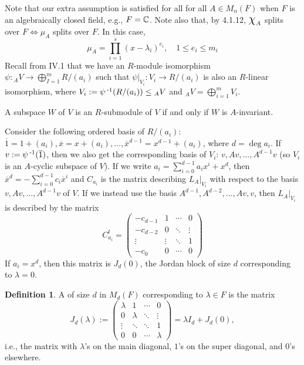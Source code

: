 \documentclass[11pt]{book}
\theoremstyle{definition}   \newtheorem{defn}[counter]{Definition} %
\newcommand{\ov}{\overline}   \newcommand{\wt}{\widetilde}
\newcommand{\mymatrix}[2]{\left( \begin{array}{#1} #2 \end{array} \right)}
\newcommand{\Chi}{\mbox{\Large $\chi$}}
\DeclareMathOperator{\ra}{\rightarrow}   \DeclareMathOperator{\Poly}{\mathbf{P}}   \DeclareMathOperator{\spn}{\textnormal{span}}   \DeclareMathOperator{\aut}{\textnormal{Aut}}
\newcommand{\vs}{\vspace{8pt}}   \newcommand{\hs}{\hspace{8pt}}
\numberwithin{counter}{chapter}
\begin{document}
Note that our extra assumption is satisfied for all for all $A \in M_n(F)$ when $F$ is an algebraically closed field, e.g., $F = \operatorname{\mathbb{C}}$. Note also that, by 4.1.12, $\Chi_A$ splits over $F \iff \mu_A$ splits over $F$. In this case,
	\[\mu_A = \prod_{i=1}^s (x-\lambda_i)^{e_i}, \quad 1 \leq e_i \leq m_i \]
Recall from IV.1 that we have an $R$-module isomorphism $\psi : {_AV} \ra \bigoplus_{I=1}^m R/(a_i)$ such that $\psi|_{V_i} : V_i \ra R/(a_i)$ is also an $R$-linear isomorphism, where $V_i := \psi\operatorname{^{-1}}(R/(a_i)) \leq {_AV}$ and ${_AV} = \bigoplus_{i=1}^m V_i$. 

\vs

\begin{remark*}
A subspace $W$ of $V$ is an $R$-submodule of $V$ if and only if $W$ is $A$-invariant. 
\end{remark*}

\vs

Consider the following ordered basis of $R/(a_i)$: $\ov{1} = 1 + (a_i), \ov{x} = x + (a_i),\dots, \ov{x}^{d-1} = x^{d-1} + (a_i)$, where $d = \deg a_i$. If $v := \psi\inv(\ov{1})$, then we also get the corresponding basis of $V_i$: $v, Av, \dots, A^{d-1}v$ (so $V_i$ is an $A$-cyclic subspace of $V$). If we write $a_i = \sum_{i=0}^{d-1} a_i x^i + x^d$, then $\ov{x}^d = -\sum_{i=0}^{d-1} c_i \ov{x}^i$ and $C_{a_i}$ is the matrix describing $L_A|_{V_i}$ with respect to the basis $v,Av,\dots,A^{d-1}v$ of $V$. If we instead use the basis $A^{d-1},A^{d-2},\dots,Av,v$, then $L_A|_{V_i}$ is described by the matrix
	\[C_{a_i}^t = \mymatrix{cccc}{-c_{d-1} & 1 & \cdots & 0 \\ -c_{d-2} & 0 & \ddots & \vdots \\ \vdots & \vdots & \ddots & 1 \\ -c_0 & 0 & \cdots & 0} \]
If $a_i = x^d$, then this matrix is $J_d(0)$, the Jordan block of size $d$ corresponding to $\lambda = 0$. 

\vs

\begin{defn}
A  of size $d$ in $M_d(F)$ corresponding to $\lambda \in F$ is the matrix
	\[J_d(\lambda) := \mymatrix{cccc}{\lambda & 1 & \cdots & 0 \\ 0 & \lambda & \ddots & \vdots \\ \vdots & \ddots & \ddots & 1 \\ 0 & 0 & \cdots & \lambda} = \lambda I_d + J_d(0), \]
i.e., the matrix with $\lambda$'s on the main diagonal, $1$'s on the super diagonal, and $0$'s elsewhere. 
\end{defn}
\end{document}
